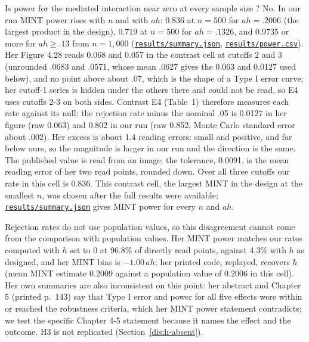 Is power for the mediated interaction near zero at every sample size \citep[Figure 4.28, printed p.~122; text p.~121; Chapter 5, p.~148]{chen2021}? No. In our run MINT power rises with $n$ and with $ah$: 0.836 at $n = 500$ for $ah = .2006$ (the largest product in the design), 0.719 at $n = 500$ for $ah = .1326$, and 0.9735 or more for $ah \ge .13$ from $n = 1{,}000$ (\href{https://github.com/alectionary/vibe-math/blob/master/formalization/chen-rdd-mediation/results/summary.json}{\nolinkurl{results/summary.json}}, \href{https://github.com/alectionary/vibe-math/blob/master/formalization/chen-rdd-mediation/results/power.csv}{\nolinkurl{results/power.csv}}). Her Figure 4.28 reads 0.068 and 0.057 in the contrast cell at cutoffs 2 and 3 (unrounded .0683 and .0571, whose mean .0627 gives the 0.063 and 0.0127 used below), and no point above about .07, which is the shape of a Type I error curve; her cutoff-1 series is hidden under the others there and could not be read, so E4 uses cutoffs 2-3 on both sides. Contrast E4 (Table~1) therefore measures each rate against its null: the rejection rate minus the nominal .05 is 0.0127 in her figure (raw 0.063) and 0.802 in our run (raw 0.852, Monte Carlo standard error about .002). Her excess is about 1.4 reading errors: small and positive, and far below ours, so the magnitude is larger in our run and the direction is the same. The published value is read from an image; the tolerance, 0.0091, is the mean reading error of her two read points, rounded down. Over all three cutoffs our rate in this cell is 0.836. This contrast cell, the largest MINT in the design at the smallest $n$, was chosen after the full results were available; \href{https://github.com/alectionary/vibe-math/blob/master/formalization/chen-rdd-mediation/results/summary.json}{\nolinkurl{results/summary.json}} gives MINT power for every $n$ and $ah$.

Rejection rates do not use population values, so this disagreement cannot come from the comparison with population values. Her MINT power matches our rates computed with $h$ set to 0 at 96.8\% of directly read points, against 4.3\% with $h$ as designed, and her MINT bias is $-1.00\,ah$; her printed code, replayed, recovers $h$ (mean MINT estimate 0.2009 against a population value of 0.2006 in this cell). Her own summaries are also inconsistent on this point: her abstract and Chapter 5 (printed p.~143) say that Type I error and power for all five effects were within or reached the robustness criteria, which her MINT power statement contradicts; we test the specific Chapter 4-5 statement because it names the effect and the outcome. H3 is not replicated (Section~\ref{dis:h-absent}).

